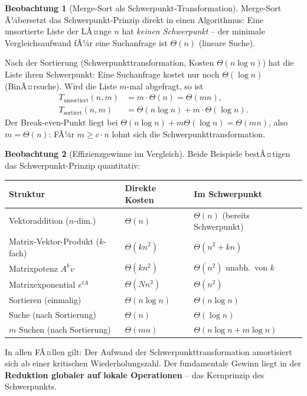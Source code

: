 ﻿\documentclass[a4paper,12pt]{report}
\theoremstyle{definition}
\newtheorem{beobachtung}{Beobachtung}
\begin{document}
\begin{beobachtung}[Merge-Sort als Schwerpunkt-Transformation]
    Merge-Sort Ã¼bersetzt das Schwerpunkt-Prinzip direkt in einen
    Algorithmus: Eine unsortierte Liste der LÃ¤nge $n$ hat
    \emph{keinen Schwerpunkt} -- der minimale Vergleichsaufwand fÃ¼r
    eine Suchanfrage ist $\Theta(n)$ (lineare Suche).

    Nach der Sortierung (Schwerpunkttransformation, Kosten $\Theta(n \log n)$)
    hat die Liste ihren Schwerpunkt: Eine Suchanfrage kostet nur noch
    $\Theta(\log n)$ (BinÃ¤rsuche). Wird die Liste $m$-mal abgefragt, so ist
    \begin{align*}
        T_{\mathrm{unsortiert}}(n, m) &= m \cdot \Theta(n) = \Theta(mn), \\
        T_{\mathrm{sortiert}}(n, m)   &= \Theta(n \log n) + m \cdot \Theta(\log n).
    \end{align*}
    Der Break-even-Punkt liegt bei
    $\Theta(n \log n) + m \Theta(\log n) = \Theta(mn)$,
    also $m = \Theta(n)$: FÃ¼r $m \geq c \cdot n$ lohnt sich die
    Schwerpunkttransformation.
\end{beobachtung}

\begin{beobachtung}[Effizienzgewinne im Vergleich]
    Beide Beispiele bestÃ¤tigen das Schwer\-punkt-Prinzip quanti\-tativ:

    \begin{center}
    \begin{tabular}{lll}
        \hline
        Struktur & Direkte Kosten & Im Schwerpunkt \\
        \hline
        Vektoraddition ($n$-dim.) & $\Theta(n)$ & $\Theta(n)$ (bereits Schwerpunkt) \\
        Matrix-Vektor-Produkt ($k$-fach) & $\Theta(kn^2)$ & $\Theta(n^2 + kn)$ \\
        Matrixpotenz $A^k v$ & $\Theta(kn^2)$ & $\Theta(n^2)$ unabh.\ von $k$ \\
        Matrixexponential $e^{tA}$ & $\Theta(Nn^3)$ & $\Theta(n^2)$ \\
        Sortieren (einmalig) & $\Theta(n \log n)$ & $\Theta(n \log n)$ \\
        Suche (nach Sortierung) & $\Theta(n)$ & $\Theta(\log n)$ \\
        $m$ Suchen (nach Sortierung) & $\Theta(mn)$ & $\Theta(n\log n + m\log n)$ \\
        \hline
    \end{tabular}
    \end{center}

    In allen FÃ¤llen gilt: Der Aufwand der Schwerpunkttransformation
    amortisiert sich ab einer kritischen Wiederholungszahl.
    Der fundamentale Gewinn liegt in der \textbf{Reduktion globaler
    auf lokale Operationen} -- das Kernprinzip des Schwerpunkts.
\end{beobachtung}
\end{document}
